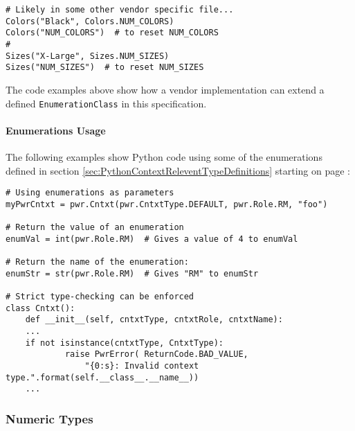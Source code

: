 \documentclass[12pt]{report} %
\begin{document}
\begin{appendices}
\begin{center}\begin{minipage}{.95\linewidth}\begin{lstlisting}
# Likely in some other vendor specific file...
Colors("Black", Colors.NUM_COLORS)
Colors("NUM_COLORS")  # to reset NUM_COLORS
#
Sizes("X-Large", Sizes.NUM_SIZES)
Sizes("NUM_SIZES")  # to reset NUM_SIZES
\end{lstlisting}\end{minipage}\end{center}

The code examples above show how a vendor implementation can extend a defined
\texttt{EnumerationClass} in this specification.

\paragraph{Enumerations Usage}\label{sec:EnumerationsUsage}

The following examples show Python code using some of the enumerations defined
in section \ref{sec:PythonContextReleventTypeDefinitions} starting on page
\pageref{sec:PythonContextReleventTypeDefinitions}:

\begin{center}\begin{minipage}{.95\linewidth}\begin{lstlisting}
# Using enumerations as parameters
myPwrCntxt = pwr.Cntxt(pwr.CntxtType.DEFAULT, pwr.Role.RM, "foo")

# Return the value of an enumeration
enumVal = int(pwr.Role.RM)  # Gives a value of 4 to enumVal

# Return the name of the enumeration:
enumStr = str(pwr.Role.RM)  # Gives "RM" to enumStr

# Strict type-checking can be enforced
class Cntxt():
    def __init__(self, cntxtType, cntxtRole, cntxtName):
    ...
    if not isinstance(cntxtType, CntxtType):
            raise PwrError( ReturnCode.BAD_VALUE,
                "{0:s}: Invalid context type.".format(self.__class__.__name__))
    ...
\end{lstlisting}\end{minipage}\end{center}

\subsubsection{Numeric Types}\label{sec:PythonNumericTypes}


\end{appendices}
\end{document}
